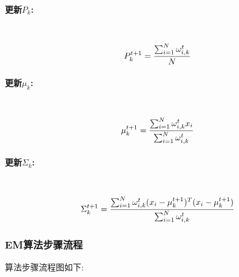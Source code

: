 \documentclass[UTF8]{article} %
\begin{document}
    \paragraph{更新$P_k$:} ~\\
    \begin{equation}
        P_k^{t+1} = \frac{\sum_{i=1}^N \omega_{i,k}^t}{N}\label{eq:P_k^{t+1}}
    \end{equation}

    \paragraph{更新$\mu_k$:} ~\\
    \begin{equation}
        \mu_k^{t+1} = \frac{\sum_{i=1}^N \omega_{i,k}^t x_i}{\sum_{i=1}^N \omega_{i,k}^t}\label{eq:mu_k^{t+1}}
    \end{equation}

    \paragraph{更新$\Sigma_k$:} ~\\
    \begin{equation}
        \Sigma_k^{t+1} = \frac{\sum_{i=1}^N \omega_{i,k}^t (x_i - \mu_k^{t+1})^T (x_i - \mu_k^{t+1})}{\sum_{i=1}^N \omega_{i,k}^t}\label{eq:Sigma_k^{t+1}}
    \end{equation}

    \subsubsection{EM算法步骤流程}

    算法步骤流程图如下:
\end{document}
